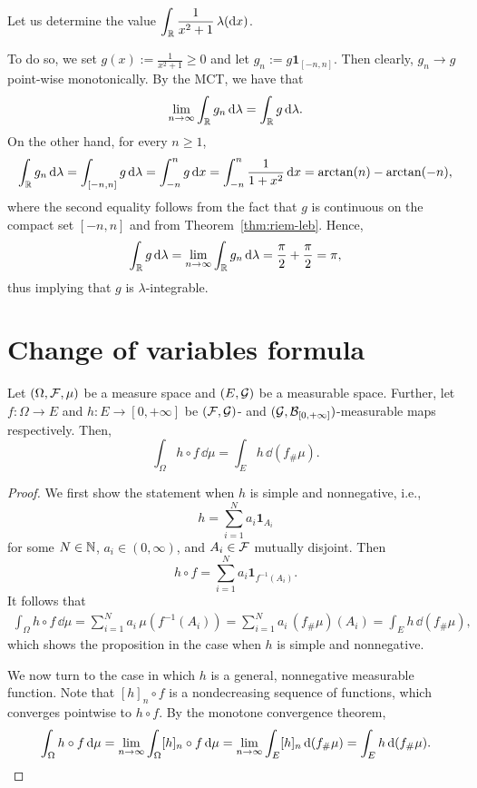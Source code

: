 \begin{example}
	Let us determine the value $\displaystyle \int_{\mathbb R} \frac{1}{x^2+1}\,\lambda(\mathrm{d} x)$.
	
	\noindent To do so, we set $g(x):= \frac{1}{x^2+1}\ge 0$ and let $g_n:= g\mathbf{1}_{[-n,n]}$. Then clearly, $g_n\to g$ point-wise monotonically. By the MCT, we have that
\[
	\lim_{n\to\infty} \int_{\mathbb R} g_n\,\mathrm{d}\lambda = \int_{\mathbb R} g\,\mathrm{d}\lambda.
\]
On the other hand, for every $n\ge 1$,
\[
	\int_{\mathbb R} g_n\,\mathrm{d}\lambda = \int_{[-n,n]} g\,\mathrm{d}\lambda = \int_{-n}^n g\,\mathrm{d} x = \int_{-n}^n \frac{1}{1+x^2}\,\mathrm{d} x = \arctan(n) - \arctan(-n),
\]
where the second equality follows from the fact that $g$ is continuous on the compact set $[-n,n]$ and from Theorem~\ref{thm:riem-leb}. Hence,
\[
	\int_{\mathbb R} g\,\mathrm{d}\lambda=\lim_{n\to\infty} \int_{\mathbb R} g_n\,\mathrm{d}\lambda = \frac{\pi}{2} + \frac{\pi}{2} = \pi,
\]
thus implying that $g$ is $\lambda$-integrable.
\end{example}




\section{Change of variables formula}
\label{sec:change-of-variables}

\begin{proposition}
Let $(\Omega, \mathcal F, \mu)$ be a measure space and $(E,\mathcal G)$ be a measurable space. Further, let $f\colon \Omega \to E$ and $h\colon E \to [0,+\infty]$ be $(\mathcal F,\mathcal G)$- and $(\mathcal G,\mathcal B_{[0,+\infty]})$-measurable maps respectively. Then,
\[
\int_\Omega h \circ f\,\dd \mu = \int_E h \, \dd (f_\# \mu).
\]
\end{proposition}

\begin{proof}
We first show the statement when $h$ is simple and nonnegative, i.e.,
\[
h = \sum_{i=1}^N a_i \mathbf{1}_{A_i}
\]
for some $N \in \mathbb N$, $a_i \in (0,\infty)$, and $A_i \in \mathcal F$ mutually disjoint. Then 
\[
	h \circ f = \sum_{i=1}^N a_i  \mathbf{1}_{f^{-1}(A_i)}.
\]
It follows that
\[
\begin{split}
\int_\Omega h \circ f\, \dd \mu 
= \sum_{i=1}^N a_i \, \mu(f^{-1}(A_i)) 
= \sum_{i=1}^N a_i \, (f_\# \mu)(A_i) 
= \int_E h \, \dd (f_\# \mu),
\end{split}
\]
which shows the proposition in the case when $h$ is simple and nonnegative. 

We now turn to the case in which $h$ is a general, nonnegative measurable function. Note that $[h]_n \circ f$ is a nondecreasing sequence of functions, which converges pointwise to $h \circ f$. By the monotone convergence theorem,
\[
\int_\Omega h \circ f\, \mathrm{d} \mu 
= \lim_{n \to \infty} \int_\Omega [h]_n \circ f\, \mathrm{d} \mu 
= \lim_{n \to \infty} \int_E [h]_n \, \mathrm{d} (f_\# \mu) 
= \int_E h \, \mathrm{d} (f_\# \mu).\qedhere
\]
\end{proof}

